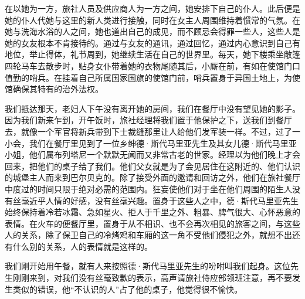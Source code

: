 \par 在以她为一方，旅社人员及供应商人为一方之间，她安排下自己的仆人。此后便是她的仆人代她与这里的新人类进行接触，同时在女主人周围维持着惯常的气氛。在她与洗海水浴的人之间，她也道出自己的成见，而不顾忌会得罪一些人，这些人是她的女友根本不肯接待的。通过与女友的通讯，通过回忆，通过内心意识到自己有地位，举止得体，礼节周到，她继续生活在自己的世界里。每天，她下楼乘坐敞篷四轮马车去散步时，贴身女仆带着她的衣物尾随其后，小厮在前，有如在使馆门口值勤的哨兵。在挂着自己所属国家国旗的使馆门前，哨兵置身于异国土地上，为使馆确保其特有的治外法权。
\par 我们抵达那天，老妇人下午没有离开她的房间，我们在餐厅中没有望见她的影子。因为我们新来乍到，开午饭时，旅社经理将我们置于他保护之下，送我们到餐厅去，就像一个军官将新兵带到下士裁缝那里让人给他们发军装一样。不过，过了一小会，我们在餐厅里见到了一位乡绅德·斯代马里亚先生及其女儿德·斯代马里亚小姐，他们属布列塔尼一个默默无闻而又非常古老的世家。经理以为他们晚上才会回来，把他们的桌子给了我们。他们父女就是为了会见居住在这附近的、他们认识的城堡主人而来到巴尔贝克的。除了接受外面的邀请和回访之外，他们在旅社餐厅中度过的时间只限于绝对必需的范围内。狂妄使他们对于坐在他们周围的陌生人没有丝毫近乎人情的好感，没有丝毫兴趣。置身于这些人之中，德·斯代马里亚先生始终保持着冷若冰霜、急如星火、拒人于千里之外、粗暴、脾气很大、心怀恶意的表情。在火车的便餐厅里，置身于从不相识、也不会再次相见的旅客之间，与这些人的关系，除了保卫自己的冷烤鸡和车厢的这一角不受他们侵犯之外，就想不出还有什么别的关系，人的表情就是这样的。
\par 我们刚开始用午餐，就有人来按照德·斯代马里亚先生的吩咐叫我们起身。这位先生刚刚来到，对我们没有丝毫致歉的表示，高声请旅社侍应部领班注意，再不要发生类似的错误，他“不认识的人”占了他的桌子，他觉得很不愉快。

